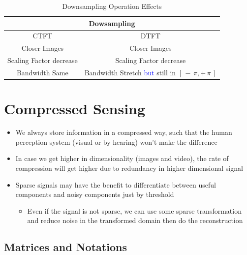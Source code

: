 \documentclass[12pt,a4paper]{book}
\begin{document}
\begin{table}[!h]
\centering
	\begin{tabular}{|c|c|}
	\hline
		\multicolumn{2}{|c|}{Dowsampling}\\ \hline
		CTFT & DTFT \\ \hline
		
		Closer Images & Closer Images  \\ \hline
		
		Scaling Factor decrease & Scaling Factor decrease \\ \hline
		Bandwidth Same & Bandwidth Stretch \textcolor{blue}{but} still in $[\, - \, \pi , + \, \pi \,]$ \\ \hline		
	\end{tabular}
	\caption{Downsampling Operation Effects}
\end{table}



\chapter{Compressed Sensing}

\begin{itemize}

\item We always store information in a compressed way, such that the human perception system (visual or by hearing) won't make the difference

\item In case we get higher in dimensionality (images and video), the rate of compression will get higher due to redundancy in higher dimensional signal 


\item Sparse signals may have the benefit to differentiate between useful components and noisy components just by threshold

	\begin{itemize}
	\item Even if the signal is not sparse, we can use some sparse transformation and reduce noise in the transformed domain then do the reconstruction
	\end{itemize}

\end{itemize}

\section{Matrices and Notations}
\end{document}
